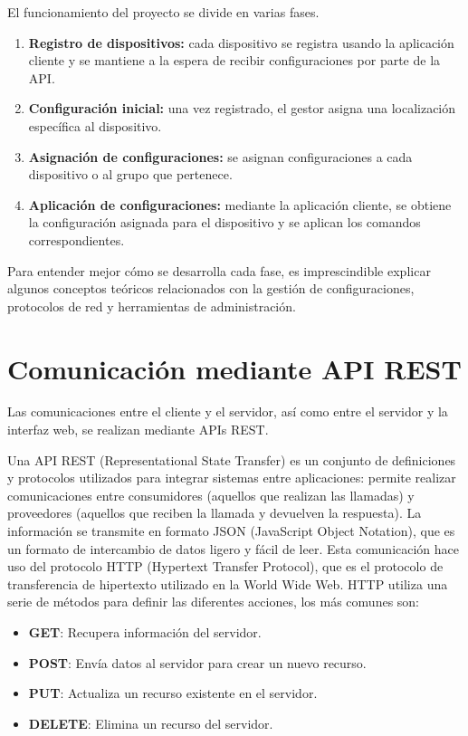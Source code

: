 
El funcionamiento del proyecto se divide en varias fases.
\begin{enumerate}
	\item \textbf{Registro de dispositivos:} cada dispositivo se registra usando la aplicación cliente y se mantiene
	a la espera de recibir configuraciones por parte de la API.
	\item \textbf{Configuración inicial:} una vez registrado, el gestor asigna una localización específica al dispositivo.
	\item \textbf{Asignación de configuraciones:} se asignan configuraciones a cada dispositivo o al grupo que pertenece.
	\item \textbf{Aplicación de configuraciones:} mediante la aplicación cliente, se obtiene la configuración asignada
	para el dispositivo y se aplican los comandos correspondientes.
\end{enumerate}

Para entender mejor cómo se desarrolla cada fase, es imprescindible explicar algunos conceptos teóricos relacionados
con la gestión de configuraciones, protocolos de red y herramientas de administración.

\section{Comunicación mediante API REST}\label{sec:comunicacion-mediante-apis-rest}

Las comunicaciones entre el cliente y el servidor, así como entre el servidor y la interfaz web, se realizan mediante
APIs REST.

Una API REST (Representational State Transfer) es un conjunto de definiciones y protocolos utilizados para integrar
sistemas entre aplicaciones\cite{redhatRestAPI}: permite realizar comunicaciones entre consumidores (aquellos que
realizan las llamadas) y proveedores (aquellos que reciben la llamada y devuelven la respuesta).
La información se transmite en formato JSON (JavaScript Object Notation), que es un formato de intercambio de datos
ligero y fácil de leer.
Esta comunicación hace uso del protocolo HTTP (Hypertext Transfer Protocol), que es el protocolo de transferencia de
hipertexto utilizado en la World Wide Web.
HTTP utiliza una serie de métodos para definir las diferentes acciones, los más comunes son:
\begin{itemize}
	\item \textbf{GET}: Recupera información del servidor.
	\item \textbf{POST}: Envía datos al servidor para crear un nuevo recurso.
	\item \textbf{PUT}: Actualiza un recurso existente en el servidor.
	\item \textbf{DELETE}: Elimina un recurso del servidor.
\end{itemize}

